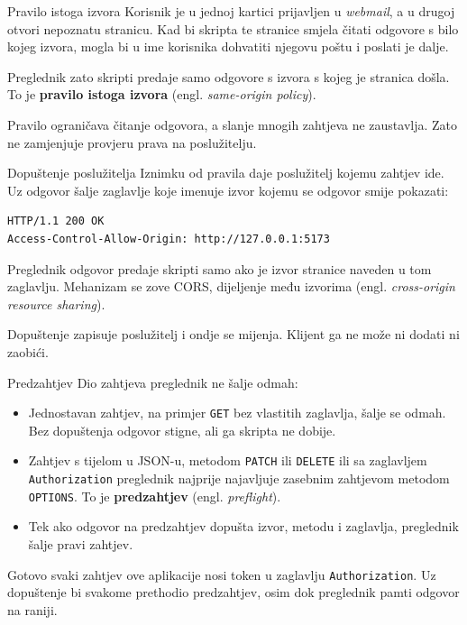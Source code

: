 \begin{frame}{Pravilo istoga izvora}
Korisnik je u jednoj kartici prijavljen u \emph{webmail}, a u drugoj otvori nepoznatu stranicu. Kad bi skripta te stranice smjela čitati odgovore s bilo kojeg izvora, mogla bi u ime korisnika dohvatiti njegovu poštu i poslati je dalje.

\vspace{0.9em}
Preglednik zato skripti predaje samo odgovore s izvora s kojeg je stranica došla. To je \textbf{pravilo istoga izvora} (engl. \emph{same-origin policy}).

\vspace{0.9em}
Pravilo ograničava čitanje odgovora, a slanje mnogih zahtjeva ne zaustavlja. Zato ne zamjenjuje provjeru prava na poslužitelju.
\end{frame}

\begin{frame}[fragile]{Dopuštenje poslužitelja}
Iznimku od pravila daje poslužitelj kojemu zahtjev ide. Uz odgovor šalje zaglavlje koje imenuje izvor kojemu se odgovor smije pokazati:

\begin{lstlisting}
HTTP/1.1 200 OK
Access-Control-Allow-Origin: http://127.0.0.1:5173
\end{lstlisting}

\vspace{0.5em}
Preglednik odgovor predaje skripti samo ako je izvor stranice naveden u tom zaglavlju. Mehanizam se zove CORS, dijeljenje među izvorima (engl. \emph{cross-origin resource sharing}).

\vspace{0.5em}
Dopuštenje zapisuje poslužitelj i ondje se mijenja. Klijent ga ne može ni dodati ni zaobići.
\end{frame}

\begin{frame}{Predzahtjev}
Dio zahtjeva preglednik ne šalje odmah:

\vspace{0.4em}
\begin{itemize}
  \itemsep0.45em
  \item Jednostavan zahtjev, na primjer \texttt{GET} bez vlastitih zaglavlja, šalje se odmah. Bez dopuštenja odgovor stigne, ali ga skripta ne dobije.
  \item Zahtjev s tijelom u JSON-u, metodom \texttt{PATCH} ili \texttt{DELETE} ili sa zaglavljem \texttt{Authorization} preglednik najprije najavljuje zasebnim zahtjevom metodom \texttt{OPTIONS}. To je \textbf{predzahtjev} (engl. \emph{preflight}).
  \item Tek ako odgovor na predzahtjev dopušta izvor, metodu i zaglavlja, preglednik šalje pravi zahtjev.
\end{itemize}

\vspace{0.6em}
Gotovo svaki zahtjev ove aplikacije nosi token u zaglavlju \texttt{Authorization}. Uz dopuštenje bi svakome prethodio predzahtjev, osim dok preglednik pamti odgovor na raniji.
\end{frame}

